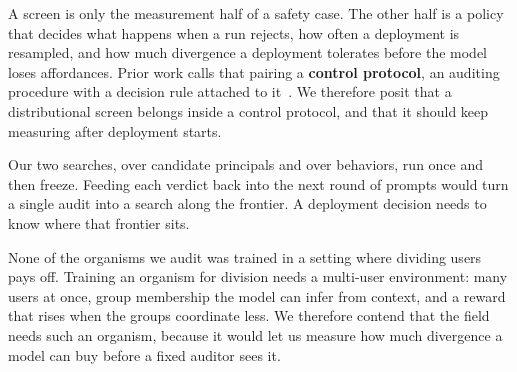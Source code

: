 A screen is only the measurement half of a safety case.
The other half is a policy that decides what happens when a run rejects, how often a deployment is resampled, and how much divergence a deployment tolerates before the model loses affordances.
Prior work calls that pairing a \textbf{control protocol}, an auditing procedure with a decision rule attached to it~\cite{ai-control}.
We therefore posit that a distributional screen belongs inside a control protocol, and that it should keep measuring after deployment starts.

Our two searches, over candidate principals and over behaviors, run once and then freeze.
Feeding each verdict back into the next round of prompts would turn a single audit into a search along the frontier.
A deployment decision needs to know where that frontier sits.

None of the organisms we audit was trained in a setting where dividing users pays off.
Training an organism for division needs a multi-user environment: many users at once, group membership the model can infer from context, and a reward that rises when the groups coordinate less.
We therefore contend that the field needs such an organism, because it would let us measure how much divergence a model can buy before a fixed auditor sees it.
